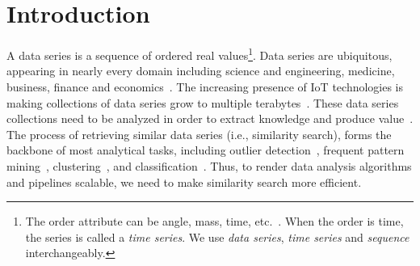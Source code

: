 \section{Introduction}
\label{sec:introduction}
A data series is a sequence of ordered real values\footnote{The order attribute can be angle, mass, time, etc.~\cite{conf/sofsem/Palpanas2016}. When the order is time, the series is called a \emph{time series}. We use \emph{data series}, \emph{time series} and \emph{sequence} interchangeably.}. 
Data series are ubiquitous, appearing in nearly every domain including science and engineering, medicine, business, finance and economics~\cite{KashinoSM99,Shasha99,humanbehaviorpatterns,volker,DBLP:conf/edbt/MirylenkaCPPM16,HuijseEPPZ14,percomJournal,windturbines,spikesorting,VALMOD,journal/jte/Williams2003,conf/compstats/Hebrail2000}. 
The increasing presence of IoT technologies is making collections of data series grow to multiple terabytes~\cite{DBLP:journal/sigmod/Palpanas15}. 
These data series collections need to be analyzed in order to extract knowledge and produce value~\cite{Palpanas2019}. 
The process of retrieving similar data series (i.e., similarity search), forms the backbone of most analytical tasks, including outlier detection~\cite{journal/csur/Chandola2009,conf/icde/boniol20}, frequent pattern mining~\cite{conf/kdd/Mueen2012}, clustering~\cite{conf/kdd/Keogh1998,conf/sdm/Rodrigues2006,conf/icdm/Keogh2011,journal/pattrecog/Warren2005}, and classification~\cite{journal/jmlr/Chen2009}. 
Thus, to render data analysis algorithms and pipelines scalable, we need to make similarity search more efficient. 

%
%

